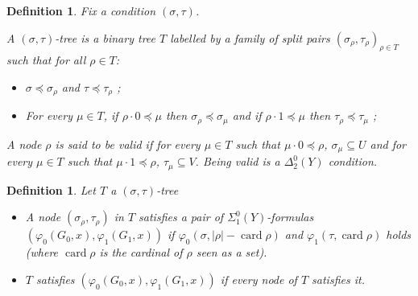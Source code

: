 \documentclass{article}
\numberwithin{theorem}{section}
\newtheorem{definition}[theorem]{Definition}
\newcommand{\uh}[0]{{\upharpoonright}}
\newcommand{\card}{\operatorname{card}}
\begin{document}
\begin{definition}
Fix a condition $(\sigma, \tau)$.

A \emph{$(\sigma, \tau)$-tree} is a binary tree $T$ labelled by a family of split pairs $(\sigma_{\rho}, \tau_{\rho})_{\rho \in T}$ such that for all $\rho \in T$:
\begin{itemize}
    \item $\sigma \preceq \sigma_{\rho}$ and $\tau \preceq \tau_{\rho}$ ;
    \item For every $\mu \in T$, if $\rho \cdot 0 \preceq \mu$ then $\sigma_{\rho} \preceq \sigma_{\mu}$ and if $\rho \cdot 1 \preceq \mu$ then $\tau_{\rho} \preceq \tau_{\mu}$ ;
\end{itemize}


     A node $\rho$ is said to be \emph{valid} if for every $\mu \in T$ such that $\mu \cdot 0 \preceq \rho$, $\sigma_{\mu} \subseteq U$ and for every $\mu \in T$ such that $\mu \cdot 1 \preceq \rho$, $\tau_{\mu} \subseteq V$. Being valid is a $\Delta^0_2(Y)$ condition.
\end{definition}

\begin{definition}
    Let $T$ a $(\sigma,\tau)$-tree 
    \begin{itemize}
        \item A node $(\sigma_{\rho}, \tau_{\rho})$ in $T$ \emph{satisfies} a pair of $\Sigma^0_1(Y)$-formulas $(\varphi_0(G_0, x), \varphi_1(G_1,x))$ if $\varphi_0(\sigma, |\rho| - \card \rho)$ and $\varphi_1(\tau, \card \rho)$ holds (where $\card \rho$ is the cardinal of $\rho$ seen as a set).
        \item $T$ \emph{satisfies} $(\varphi_0(G_0, x), \varphi_1(G_1,x))$ if every node of $T$ satisfies it.
    \end{itemize}
\end{definition}
\end{document}
